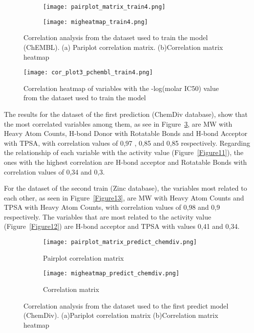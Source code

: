 \documentclass[final,times,twocolumn,article]{elsarticle}
\begin{document}
\begin{figure}[h]
    \begin{subfigure}{0.5\textwidth}
        \texttt{[image: pairplot\_matrix\_train4.png]} 
        \caption{}%
    \end{subfigure}
    \hfill
    \begin{subfigure}{0.5\textwidth}
        \texttt{[image: migheatmap\_train4.png]}
        \caption{} %
    \end{subfigure}
    
    \caption{Correlation analysis from the dataset used to train the model (ChEMBL). (a) Pariplot correlation matrix. (b)Correlation matrix heatmap}
    \label{Figure8}
\end{figure}

\begin{figure}[h]
    \centering 
     \texttt{[image: cor\_plot3\_pchembl\_train4.png]}	
     \caption{Correlation heatmap of variables with the -log(molar IC50) value from the dataset used to train the model} 
     \label{Figure9}
 \end{figure}

 The results for the dataset of the first prediction (ChemDiv database), show that the most correlated variables among them, as see in Figure~\ref{Figure10}, are MW with Heavy Atom Counts, H-bond Donor with Rotatable Bonds and H-bond Acceptor with TPSA, with correlation values of 0,97 , 0,85 and 0,85 respectively. Regarding the relationship of each variable with the activity value (Figure~\ref{Figure11}), the ones with the highest correlation are H-bond acceptor and Rotatable Bonds with correlation values of 0,34 and 0,3. 

 For the dataset of the second train (Zinc database), the variables most related to each other, as seen in Figure~\ref{Figure13}, are MW with Heavy Atom Counts and TPSA with Heavy Atom Counts, with correlation values of 0,98 and 0,9 respectively. The variables that are most related to the activity value (Figure~\ref{Figure12}) are H-bond acceptor and TPSA with values 0,41 and 0,34. 

\begin{figure}[h]
    \begin{subfigure}{0.5\textwidth}
        \texttt{[image: pairplot\_matrix\_predict\_chemdiv.png]} 
        \caption{Pairplot correlation matrix}
    \end{subfigure}
    \begin{subfigure}{0.5\textwidth}
        \texttt{[image: migheatmap\_predict\_chemdiv.png]}
        \caption{Correlation matrix}
    \end{subfigure}
    
    \caption{Correlation analysis from the dataset used to the first predict model (ChemDiv). (a)Pariplot correlation matrix (b)Correlation matrix heatmap}
    \label{Figure10}
\end{figure}
\end{document}

